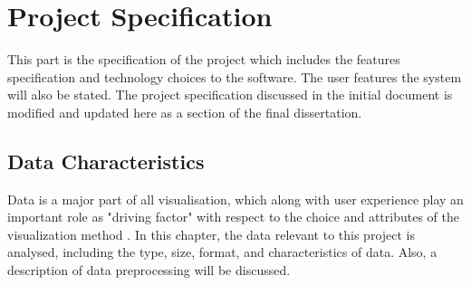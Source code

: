\clearpage
\section{Project Specification}
This part is the specification of the project which includes the features specification and technology choices to the software. The user features the system will also be stated. The project specification discussed in the initial document is modified and updated here as a section of the final dissertation.

\subsection{Data Characteristics}

Data is a major part of all visualisation, which along with user experience play an important role as "driving factor" with respect to the choice and attributes of the visualization method \cite{Laramee}. In this chapter, the data relevant to this project is analysed, including the type, size, format, and characteristics of data. Also, a description of data preprocessing will be discussed. 

